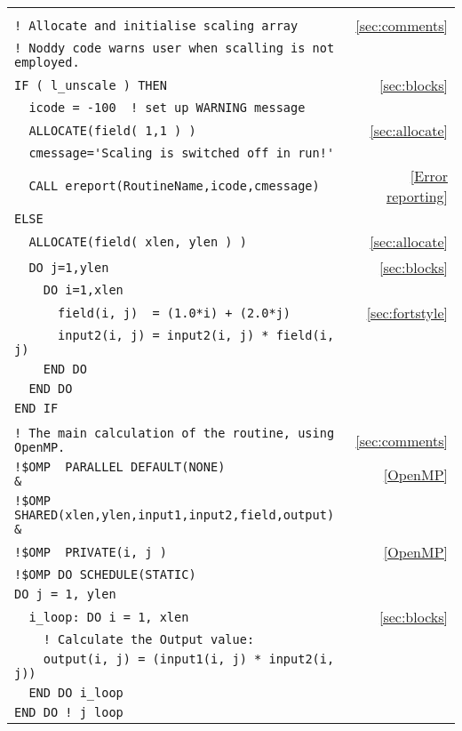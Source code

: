 \begin{longtable}{lr}
\verb|| & \\  
\verb|! Allocate and initialise scaling array| & \ref{sec:comments}\\ 
\verb|! Noddy code warns user when scalling is not employed.  | & \\ 
\verb|IF ( l_unscale ) THEN |& \ref{sec:blocks}\\ 
\verb|  icode = -100  ! set up WARNING message | & \\
\verb|  ALLOCATE(field( 1,1 ) )|& \ref{sec:allocate}\\
\verb|  cmessage='Scaling is switched off in run!'  |& \\
\verb|  CALL ereport(RoutineName,icode,cmessage)|& \ref{Error reporting} \\
\verb|ELSE |& \\  
\verb|  ALLOCATE(field( xlen, ylen ) )|& \ref{sec:allocate}\\ 
\verb|  DO j=1,ylen | & \ref{sec:blocks} \\ 
\verb|    DO i=1,xlen | & \\ 
\verb|      field(i, j)  = (1.0*i) + (2.0*j)  | & \ref{sec:fortstyle}\\
\verb|      input2(i, j) = input2(i, j) * field(i, j) | & \\ 
\verb|    END DO  | & \\ 
\verb|  END DO  | & \\ 
\verb|END IF |& \\  
\verb|| & \\ 
\verb|! The main calculation of the routine, using OpenMP.| & \ref{sec:comments}\\
\verb|!$OMP  PARALLEL DEFAULT(NONE)                                         & |& \ref{OpenMP}\\
\verb|!$OMP  SHARED(xlen,ylen,input1,input2,field,output)                   & |& \\
\verb|!$OMP  PRIVATE(i, j )           |& \ref{OpenMP}\\
\verb|!$OMP DO SCHEDULE(STATIC) |& \\ 
\verb|DO j = 1, ylen| & \\  
\verb|  i_loop: DO i = 1, xlen| & \ref{sec:blocks} \\  
\verb|    ! Calculate the Output value:    | & \\  
\verb|    output(i, j) = (input1(i, j) * input2(i, j)) | & \\  
\verb|  END DO i_loop | & \\  
\verb|END DO ! j loop | & \\ 

\end{longtable}
